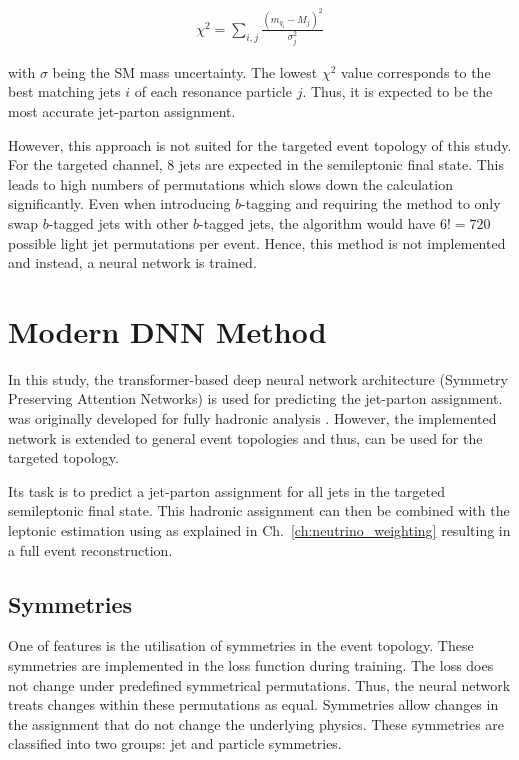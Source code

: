 \documentclass[bachelor,ngerman,english]{GAUBM}
\begin{document}
\begin{align*}
    \chi^2 = \sum_{i,j} \frac{(m_{q_i}-M_j)^2}{\sigma_j^2}
\end{align*}

with $\sigma$ being the SM mass uncertainty. The lowest $\chi^2$ value corresponds to the best matching jets $i$ of each resonance particle $j$. Thus, it is expected to be the most accurate jet-parton assignment. 

However, this approach is not suited for the targeted event topology of this study. For the targeted \ttHWW channel, 8 jets are expected in the semileptonic final state. This leads to high numbers of permutations which slows down the calculation significantly. Even when introducing $b$-tagging and requiring the method to only swap $b$-tagged jets with other $b$-tagged jets, the algorithm would have $6!=720$ possible light jet permutations per event. Hence, this method is not implemented and instead, a neural network is trained.

\section{Modern DNN Method}
\label{sec:spanet:modern}
In this study, the transformer-based deep neural network architecture \spanet (Symmetry Preserving Attention Networks) \cite{spanet_01,spanet_02} is used for predicting the jet-parton assignment. \spanet was originally developed for fully hadronic \ttbar analysis \cite{spanet_03}. However, the implemented network is extended to general event topologies \cite{spanet_01} and thus, can be used for the targeted \ttHWW topology.

Its task is to predict a jet-parton assignment for all jets in the targeted semileptonic final state. This hadronic assignment can then be combined with the leptonic estimation using \NW as explained in Ch.~\ref{ch:neutrino_weighting} resulting in a full event reconstruction. 

\subsection*{Symmetries}
One of \spanets features is the utilisation of symmetries in the event topology. These symmetries are implemented in the loss function during training. The loss does not change under predefined symmetrical permutations. Thus, the neural network treats changes within these permutations as equal. Symmetries allow changes in the assignment that do not change the underlying physics. These symmetries are classified into two groups: jet and particle symmetries. 
\end{document}

